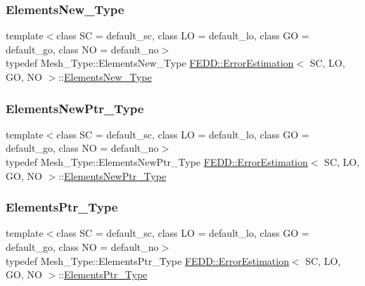 \subsubsection{\texorpdfstring{Elements\+New\+\_\+\+Type}{ElementsNew\_Type}}
{\footnotesize\ttfamily template$<$class SC  = default\+\_\+sc, class LO  = default\+\_\+lo, class GO  = default\+\_\+go, class NO  = default\+\_\+no$>$ \\
typedef Mesh\+\_\+\+Type\+::\+Elements\+New\+\_\+\+Type \hyperlink{classFEDD_1_1ErrorEstimation}{F\+E\+D\+D\+::\+Error\+Estimation}$<$ SC, LO, GO, NO $>$\+::\hyperlink{classFEDD_1_1ErrorEstimation_a4a9dbcc947775568cce988cb4a68a40b}{Elements\+New\+\_\+\+Type}}

\mbox{\label{classFEDD_1_1ErrorEstimation_a524b367a9af6f2c128a7a7ae27d74535}} 
\subsubsection{\texorpdfstring{Elements\+New\+Ptr\+\_\+\+Type}{ElementsNewPtr\_Type}}
{\footnotesize\ttfamily template$<$class SC  = default\+\_\+sc, class LO  = default\+\_\+lo, class GO  = default\+\_\+go, class NO  = default\+\_\+no$>$ \\
typedef Mesh\+\_\+\+Type\+::\+Elements\+New\+Ptr\+\_\+\+Type \hyperlink{classFEDD_1_1ErrorEstimation}{F\+E\+D\+D\+::\+Error\+Estimation}$<$ SC, LO, GO, NO $>$\+::\hyperlink{classFEDD_1_1ErrorEstimation_a524b367a9af6f2c128a7a7ae27d74535}{Elements\+New\+Ptr\+\_\+\+Type}}

\mbox{\label{classFEDD_1_1ErrorEstimation_ae8e03ce6215a8a139c1c8e9d662030ce}} 
\subsubsection{\texorpdfstring{Elements\+Ptr\+\_\+\+Type}{ElementsPtr\_Type}}
{\footnotesize\ttfamily template$<$class SC  = default\+\_\+sc, class LO  = default\+\_\+lo, class GO  = default\+\_\+go, class NO  = default\+\_\+no$>$ \\
typedef Mesh\+\_\+\+Type\+::\+Elements\+Ptr\+\_\+\+Type \hyperlink{classFEDD_1_1ErrorEstimation}{F\+E\+D\+D\+::\+Error\+Estimation}$<$ SC, LO, GO, NO $>$\+::\hyperlink{classFEDD_1_1ErrorEstimation_ae8e03ce6215a8a139c1c8e9d662030ce}{Elements\+Ptr\+\_\+\+Type}}

